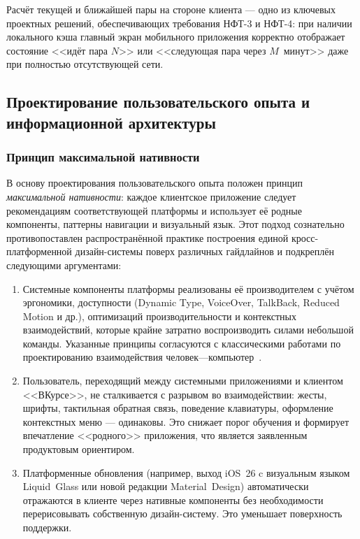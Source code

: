 Расчёт текущей и ближайшей пары на стороне клиента --- одно из ключевых проектных решений, обеспечивающих требования НФТ-3 и НФТ-4: при наличии локального кэша главный экран мобильного приложения корректно отображает состояние <<идёт пара $N$>> или <<следующая пара через $M$~минут>> даже при полностью отсутствующей сети.

\subsection{Проектирование пользовательского опыта и информационной архитектуры}
\label{subsec:ux-and-ia}

\subsubsection{Принцип максимальной нативности}
\label{subsubsec:native-principle}

В основу проектирования пользовательского опыта положен принцип \emph{максимальной нативности}: каждое клиентское приложение следует рекомендациям соответствующей платформы и использует её родные компоненты, паттерны навигации и визуальный язык. Этот подход сознательно противопоставлен распространённой практике построения единой кросс-платформенной дизайн-системы поверх различных гайдлайнов и подкреплён следующими аргументами:

\begin{enumerate}
  \item Системные компоненты платформы реализованы её производителем с учётом эргономики, доступности (Dynamic Type, VoiceOver, TalkBack, Reduced Motion и др.), оптимизаций производительности и контекстных взаимодействий, которые крайне затратно воспроизводить силами небольшой команды. Указанные принципы согласуются с классическими работами по проектированию взаимодействия человек---компьютер~\cite{norman-design, raskin-interface}.
  \item Пользователь, переходящий между системными приложениями и клиентом <<ВКурсе>>, не сталкивается с разрывом во взаимодействии: жесты, шрифты, тактильная обратная связь, поведение клавиатуры, оформление контекстных меню --- одинаковы. Это снижает порог обучения и формирует впечатление <<родного>> приложения, что является заявленным продуктовым ориентиром.
  \item Платформенные обновления (например, выход iOS~26 c визуальным языком Liquid~Glass или новой редакции Material~Design) автоматически отражаются в клиенте через нативные компоненты без необходимости перерисовывать собственную дизайн-систему. Это уменьшает поверхность поддержки.
\end{enumerate}

